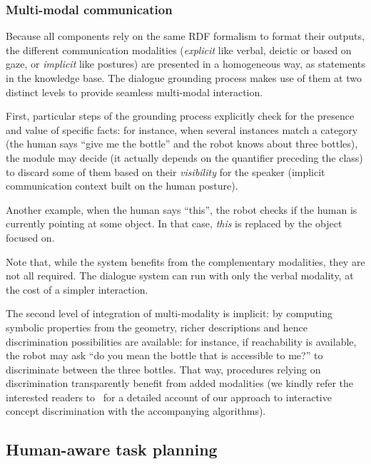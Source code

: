 \documentclass[preprint,3p,times]{elsarticle}
\begin{document}
\subsubsection{Multi-modal communication}

Because all components rely on the same RDF formalism to format their outputs,
the different communication modalities (\emph{explicit} like verbal, deictic or
based on gaze, or \emph{implicit} like postures) are presented in a homogeneous
way, as statements in the knowledge base. The dialogue grounding process makes
use of them at two distinct levels to provide seamless multi-modal interaction.

First, particular steps of the grounding process explicitly check for the
presence and value of specific facts: for instance, when several instances
match a category (the human says ``give me the bottle'' and the robot knows
about three bottles), the module may decide (it actually depends on the
quantifier preceding the class) to discard some of them based on their
\emph{visibility} for the speaker (implicit communication context built on the
human posture).

Another example, when the human says ``this'', the robot checks if the human is
currently pointing at some object. In that case, \emph{this} is replaced by the
object focused on.

Note that, while the system benefits from the complementary modalities, they
are not all required. The dialogue system can run with only the verbal
modality, at the cost of a simpler interaction.

The second level of integration of multi-modality is implicit: by computing
symbolic properties from the geometry, richer descriptions and hence
discrimination possibilities are available: for instance, if reachability is
available, the robot may ask ``do you mean the bottle that is accessible to
me?'' to discriminate between the three bottles. That way, procedures relying
on discrimination transparently benefit from added modalities (we kindly refer
the interested readers to~\cite{Ros2010b} for a detailed account of our
approach to interactive concept discrimination with the accompanying algorithms).


\subsection{Human-aware task planning}
\label{hatp}
\end{document}
